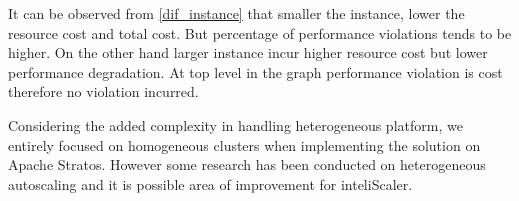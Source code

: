 It can be observed from \ref{dif_instance} that smaller the instance, lower the resource cost and total cost. But percentage of performance violations tends to be higher. On the other hand larger instance incur higher resource cost but lower performance degradation. At top level in the graph performance violation is cost therefore no  violation incurred.

Considering the added complexity in handling heterogeneous platform, we entirely focused on homogeneous clusters when implementing the solution on Apache Stratos. However some research \cite{hetero} has been conducted on heterogeneous autoscaling and it is possible area of improvement for inteliScaler.